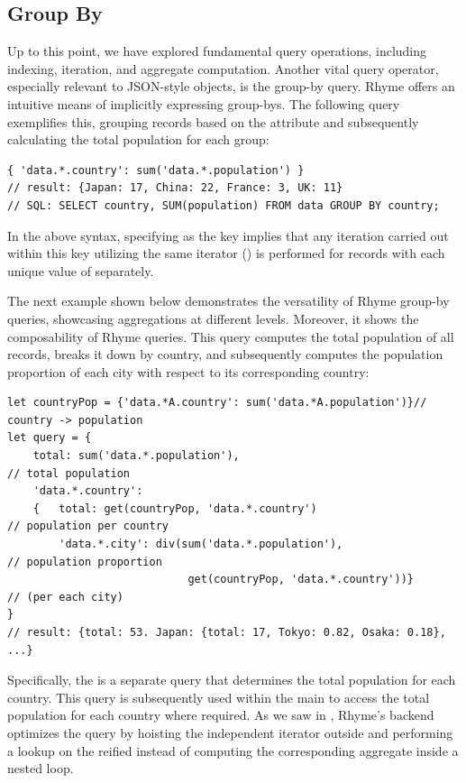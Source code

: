 \documentclass[runningheads]{llncs}
\newcommand{\lang}{Rhyme}
\begin{document}
\subsection{Group By}\label{subsec:groupby}
Up to this point, we have explored fundamental query operations, including indexing,
iteration, and aggregate computation.
Another vital query operator, especially relevant to JSON-style objects,
is the group-by query.
\lang{} offers an intuitive means of implicitly expressing group-bys.
The following query exemplifies this, grouping records based on the
 attribute and subsequently calculating the total population
for each group:

\begin{lstlisting}[style=JavaScript, columns=flexible, numbers=none]
{ 'data.*.country': sum('data.*.population') }
// result: {Japan: 17, China: 22, France: 3, UK: 11}
// SQL: SELECT country, SUM(population) FROM data GROUP BY country;
\end{lstlisting}

In the above syntax, specifying  as the key implies
that any iteration carried out within this key utilizing the same
iterator (\inline{*}) is performed for records with each unique value of 
separately.

The next example shown below demonstrates the versatility of \lang{} group-by queries, showcasing
aggregations at different levels.
Moreover, it shows the composability of \lang{} queries.
This query computes the total population of all records, breaks it down by country,
and subsequently computes the population proportion of each city with respect to its
corresponding country:

\begin{lstlisting}[style=JavaScript, columns=flexible, numbers=none]
let countryPop = {'data.*A.country': sum('data.*A.population')}// country -> population
let query = { 
    total: sum('data.*.population'),                                  // total population
    'data.*.country':
    {   total: get(countryPop, 'data.*.country')                      // population per country
        'data.*.city': div(sum('data.*.population'),                  // population proportion
                            get(countryPop, 'data.*.country'))}       // (per each city)
}
// result: {total: 53. Japan: {total: 17, Tokyo: 0.82, Osaka: 0.18}, ...}
\end{lstlisting}

Specifically, the  is a separate query that determines the total
population for each country.
This query is subsequently used within the main  to access the
total population for each country where required.
As we saw in , \lang{}'s backend optimizes the
query by hoisting the independent  iterator outside and performing
a lookup on the reified  instead of computing the
corresponding aggregate inside a nested loop.
\end{document}

